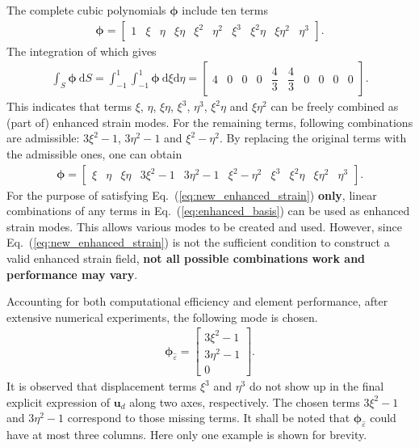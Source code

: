 \documentclass[3p,sort&compress,review,11pt]{elsarticle}
\newcommand*{\md}[1]{\mathrm{d}#1}
\newcommand*{\eqsref}[1]{Eq.~(\ref{#1})}
\begin{document}
The complete cubic polynomials $\mathbold{\phi}$ include ten terms
\begin{gather*}
\mathbold{\phi}=\begin{bmatrix}
1&\xi&\eta&\xi\eta&\xi^2&\eta^2&\xi^3&\xi^2\eta&\xi\eta^2&\eta^3
\end{bmatrix}.
\end{gather*}
The integration of which gives
\begin{gather*}
\int_{S}\mathbold{\phi}~\md{S}=\int_{-1}^{1}\int_{-1}^{1}\mathbold{\phi}~\md{\xi}\md{\eta}=\begin{bmatrix}
	4 & 0 & 0 & 0 & \dfrac{4}{3} & \dfrac{4}{3} & 0 & 0 & 0 & 0
\end{bmatrix}.
\end{gather*}
This indicates that terms $\xi$, $\eta$, $\xi\eta$, $\xi^3$, $\eta^3$, $\xi^2\eta$ and $\xi\eta^2$ can be freely combined as (part of) enhanced strain modes. For the remaining terms, following combinations are admissible: $3\xi^2-1$, $3\eta^2-1$ and $\xi^2-\eta^2$. By replacing the original terms with the admissible ones, one can obtain
\begin{gather}\label{eq:enhanced_basis}
\mathbold{\phi}=\left[\begin{array}{cc|cccc|cccc}
\xi&\eta&\xi\eta&3\xi^2-1&3\eta^2-1&\xi^2-\eta^2&\xi^3&\xi^2\eta&\xi\eta^2&\eta^3
\end{array}\right].
\end{gather}
For the purpose of satisfying \eqsref{eq:new_enhanced_strain} \textbf{only}, linear combinations of any terms in \eqsref{eq:enhanced_basis} can be used as enhanced strain modes. This allows various modes to be created and used. However, since  \eqsref{eq:new_enhanced_strain} is not the sufficient condition to construct a valid enhanced strain field, \textbf{not all possible combinations work and performance may vary}.

Accounting for both computational efficiency and element performance, after extensive numerical experiments, the following mode is chosen.
\begin{gather}\label{eq:interpolation_enhanced_strain_modified}
\mathbold{\phi}_{\hat{\varepsilon}}=
\begin{bmatrix}
	3\xi^2-1  \\
	3\eta^2-1 \\
	0
\end{bmatrix}.
\end{gather}
It is observed that displacement terms $\xi^3$ and $\eta^3$ do not show up in the final explicit expression of $\mathbold{u}_d$ along two axes, respectively. The chosen terms $3\xi^2-1$ and $3\eta^2-1$ correspond to those missing terms. It shall be noted that $\mathbold{\phi}_{\hat{\varepsilon}}$ could have at most three columns. Here only one example is shown for brevity.
\end{document}
